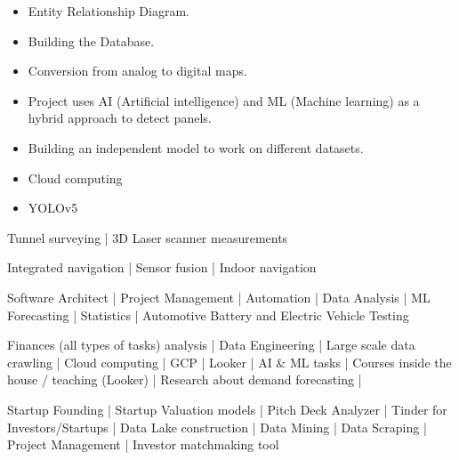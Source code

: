 \documentclass[10pt,a4paper]{altacv}
\begin{document}
\newpage
{}
\begin{itemize}
\item Entity Relationship Diagram.
\item Building the Database.
\item Conversion from analog to digital maps.
\end{itemize}

\begin{itemize}
\item Project uses AI (Artificial intelligence) and ML (Machine learning) as 
a hybrid approach to detect panels. 
\item Building an independent model to work on different datasets.
\item Cloud computing
\item YOLOv5
\end{itemize}


\begin{itemize}
Tunnel surveying | 3D Laser scanner measurements
\end{itemize}


\begin{itemize}
Integrated navigation | Sensor fusion | Indoor navigation
\end{itemize}

\begin{itemize}
Software Architect | Project Management | Automation | Data Analysis | ML Forecasting | Statistics | Automotive Battery and Electric Vehicle Testing
\end{itemize}

\begin{itemize}
Finances (all types of tasks) analysis | Data Engineering | Large scale data crawling  | Cloud computing | GCP | Looker | AI \& ML tasks | Courses inside the house / teaching (Looker) | Research about demand forecasting |
\end{itemize}

\begin{itemize}
Startup Founding | Startup Valuation models | Pitch Deck Analyzer | Tinder for Investors/Startups | Data Lake construction | Data Mining | Data Scraping | Project Management | Investor matchmaking tool
\end{itemize}



\clearpage
\end{document}
